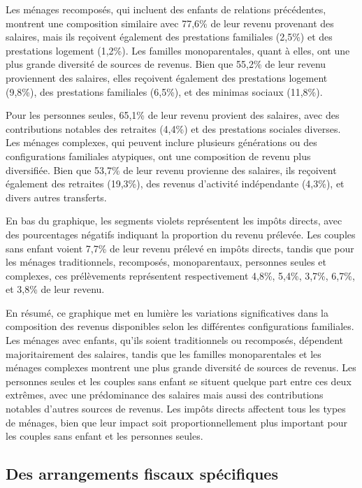 \documentclass[
  12pt,
]{book}
\begin{document}
Les ménages recomposés, qui incluent des enfants de relations
précédentes, montrent une composition similaire avec 77,6\% de leur
revenu provenant des salaires, mais ils reçoivent également des
prestations familiales (2,5\%) et des prestations logement (1,2\%). Les
familles monoparentales, quant à elles, ont une plus grande diversité de
sources de revenus. Bien que 55,2\% de leur revenu proviennent des
salaires, elles reçoivent également des prestations logement (9,8\%),
des prestations familiales (6,5\%), et des minimas sociaux (11,8\%).

Pour les personnes seules, 65,1\% de leur revenu provient des salaires,
avec des contributions notables des retraites (4,4\%) et des prestations
sociales diverses. Les ménages complexes, qui peuvent inclure plusieurs
générations ou des configurations familiales atypiques, ont une
composition de revenu plus diversifiée. Bien que 53,7\% de leur revenu
provienne des salaires, ils reçoivent également des retraites (19,3\%),
des revenus d'activité indépendante (4,3\%), et divers autres
transferts.

En bas du graphique, les segments violets représentent les impôts
directs, avec des pourcentages négatifs indiquant la proportion du
revenu prélevée. Les couples sans enfant voient 7,7\% de leur revenu
prélevé en impôts directs, tandis que pour les ménages traditionnels,
recomposés, monoparentaux, personnes seules et complexes, ces
prélèvements représentent respectivement 4,8\%, 5,4\%, 3,7\%, 6,7\%, et
3,8\% de leur revenu.

En résumé, ce graphique met en lumière les variations significatives
dans la composition des revenus disponibles selon les différentes
configurations familiales. Les ménages avec enfants, qu'ils soient
traditionnels ou recomposés, dépendent majoritairement des salaires,
tandis que les familles monoparentales et les ménages complexes montrent
une plus grande diversité de sources de revenus. Les personnes seules et
les couples sans enfant se situent quelque part entre ces deux extrêmes,
avec une prédominance des salaires mais aussi des contributions notables
d'autres sources de revenus. Les impôts directs affectent tous les types
de ménages, bien que leur impact soit proportionnellement plus important
pour les couples sans enfant et les personnes seules.

\subsection{Des arrangements fiscaux
spécifiques}\label{des-arrangements-fiscaux-spuxe9cifiques}
\end{document}
